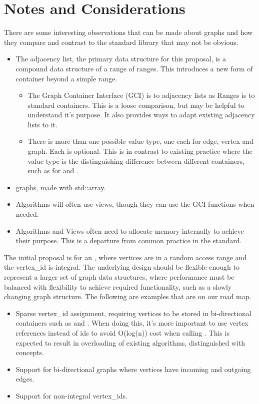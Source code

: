 \section{Notes and Considerations}
There are some interesting observations that can be made about graphs and how they compare and contrast to the 
standard library that may not be obvious.
\begin{itemize}
      \item The adjacency list, the primary data structure for this proposal, is a compound data structure of a
          range of ranges. This introduces a new form of container beyond a simple range.
      \begin{itemize}
            \item The Graph Container Interface (GCI) is to adjacency lists as Ranges is to standard containers. This is a loose comparison,
                  but may be helpful to understand it's purpose. It also provides ways to adapt existing adjacency lists
                  to it. 
            \item There is more than one possible value type, one each for edge, vertex and graph. Each is optional.
                  This is in contrast to existing practice where the value type is the distinguishing difference between
                  different containers, such as for  and .
      \end{itemize}
      \item {} graphs, made with std::array.
      \item Algorithms will often use views, though they can use the GCI functions when needed.
      \item Algorithms and Views often need to allocate memory internally to achieve their purpose. This is a departure from
            common practice in the standard.
\end{itemize}

The initial proposal is for an , where vertices are in a random access range
and the vertex\_id is integral. The underlying design should be flexible enough to represent a larger 
set of graph data structures, where performance must be balanced with flexibility to achieve required 
functionality, such as a slowly changing graph structure. The following are examples that are on our road map.
\begin{itemize}
      \item Sparse vertex\_id assignment, requiring vertices to be stored in bi-directional containers
            such as  and . When doing this, it's more important to use
            vertex references instead of ids to avoid O(log(n)) cost when calling . 
            This is expected to result in overloading of existing algorithms, distinguished with concepts.
      \item Support for bi-directional graphs where vertices have incoming and outgoing edges.
      \item Support for non-integral vertex\_ids.
\end{itemize}

